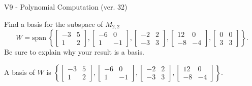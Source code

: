 \begin{exercise}
  \begin{exerciseTitle}V9 - Polynomial Computation (ver. 32)\end{exerciseTitle}
  \begin{exerciseStatement}
    Find a basis for the subspace of \(M_{2,2}\) 
\[W=\mathrm{span}\ \left\{\left[\begin{array}{cc}
-3 & 5 \\
1 & 2
\end{array}\right] , \left[\begin{array}{cc}
-6 & 0 \\
1 & -1
\end{array}\right] , \left[\begin{array}{cc}
-2 & 2 \\
-3 & 3
\end{array}\right] , \left[\begin{array}{cc}
12 & 0 \\
-8 & -4
\end{array}\right] , \left[\begin{array}{cc}
0 & 0 \\
3 & 3
\end{array}\right]\right\}.\]
 Be sure to explain why your result is a basis.


  \end{exerciseStatement}
  \begin{exerciseAnswer}
   A basis of \(W\) is  \(\left\{\left[\begin{array}{cc}
-3 & 5 \\
1 & 2
\end{array}\right] , \left[\begin{array}{cc}
-6 & 0 \\
1 & -1
\end{array}\right] , \left[\begin{array}{cc}
-2 & 2 \\
-3 & 3
\end{array}\right] , \left[\begin{array}{cc}
12 & 0 \\
-8 & -4
\end{array}\right]\right\}\).
  


  \end{exerciseAnswer}
\end{exercise}